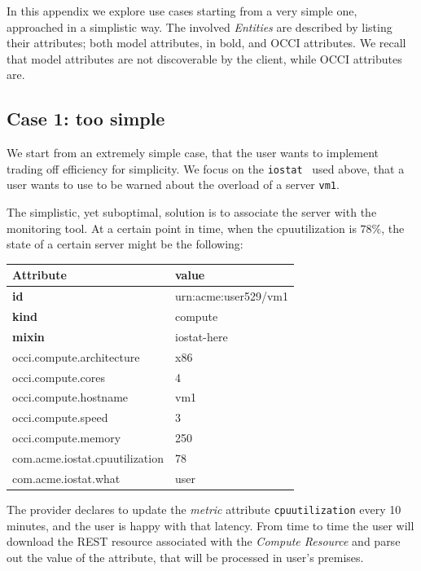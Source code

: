 \documentclass[10pt]{article}  %
\begin{document}
In this appendix we explore use cases starting from a very simple one, approached in a simplistic way. The involved {\em Entities} are described by listing their attributes; both model attributes, in bold, and OCCI attributes. We recall that model attributes are not discoverable by the client, while OCCI attributes are.

\subsection*{Case 1: too simple}

We start from an extremely simple case, that the user wants to implement trading off efficiency for simplicity. We focus on the {\tt iostat} \mi\ used above, that a user wants to use to be warned about the overload of a server {\tt \small vm1}.

The simplistic, yet suboptimal, solution is to associate the server with the monitoring tool. At a certain point in time, when the cpuutilization is $78\%$, the state of a certain server might be the following:

{
\small
\begin{tabular}{l|l}
Attribute                         & value \\ \hline
{\bf id}                          & urn:acme:user529/vm1 \\
{\bf kind}                        & compute \\
{\bf mixin}                       & iostat-here \\
occi.compute.architecture         & x86   \\
occi.compute.cores                & 4     \\ 
occi.compute.hostname             & vm1   \\            
occi.compute.speed                & 3     \\                  
occi.compute.memory               & 250   \\
com.acme.iostat.cpuutilization    & 78    \\                     
com.acme.iostat.what              & user  \\
\end{tabular}
}

The provider declares to update the {\em metric} attribute {\tt \small cpuutilization} every 10 minutes, and the user is happy with that latency. From time to time the user will download the REST resource associated with the {\em Compute Resource} and parse out the value of the attribute, that will be processed in user's premises.
\end{document}
